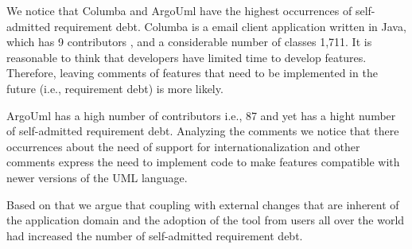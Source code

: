 We notice that Columba and ArgoUml have the highest occurrences of self-admitted requirement debt. Columba is a email client application written in Java, which has 9 contributors \cite{Openhub:home}, and a considerable number of classes 1,711. It is reasonable to think that developers have limited time to develop features. Therefore, leaving comments of features that need to be implemented in the future (i.e., requirement debt) is more likely. 

ArgoUml has a high number of contributors i.e., 87 and yet has a hight number of self-admitted requirement debt. Analyzing the comments we notice that there occurrences about the need of support for internationalization and other comments express the need to implement code to make features compatible with newer versions of the UML language. 

Based on that we argue that coupling with external changes that are inherent of the application domain and the adoption of the tool from users all over the world \cite{Openhub:home} had increased the number of self-admitted requirement debt. 


